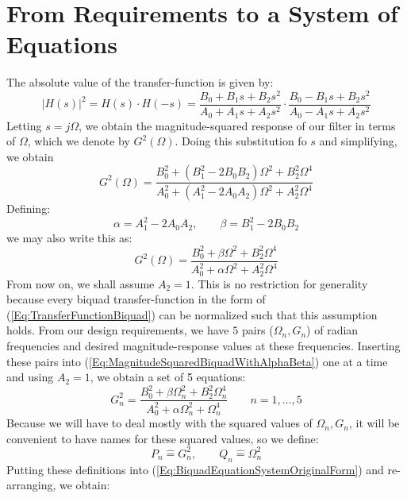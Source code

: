 \section{From Requirements to a System of Equations}
The absolute value of the transfer-function is given by:
\begin{equation}
 |H(s)|^2 = H(s) \cdot H(-s) 
 = \frac{B_0 + B_1 s + B_2 s^2}{A_0 + A_1 s + A_2 s^2} \cdot \frac{B_0 - B_1 s + B_2 s^2}{A_0 - A_1 s + A_2 s^2}
\end{equation}
Letting $s = j \Omega$, we obtain the magnitude-squared response of our filter in terms of $\Omega$, which we denote by $G^2(\Omega)$. Doing this substitution fo $s$ and simplifying, we obtain
\begin{equation}
\label{Eq:MagnitudeSquaredBiquad}
 G^2(\Omega) = \frac{B_0^2 + (B_1^2 - 2 B_0 B_2) \Omega^2 + B_2^2 \Omega^4}{A_0^2 + (A_1^2 - 2 A_0 A_2) \Omega^2 + A_2^2 \Omega^4}
\end{equation}
Defining:
\begin{equation}
\label{Eq:AlphaBeta}
 \alpha = A_1^2 - 2 A_0 A_2, \qquad
 \beta = B_1^2 - 2 B_0 B_2
\end{equation}
we may also write this as:
\begin{equation}
\label{Eq:MagnitudeSquaredBiquadWithAlphaBeta}
 G^2(\Omega) = \frac{B_0^2 + \beta \Omega^2 + B_2^2 \Omega^4}{A_0^2 + \alpha \Omega^2 + A_2^2 \Omega^4}
\end{equation}
From now on, we shall assume $A_2 = 1$. This is no restriction for generality because every biquad transfer-function in the form of (\ref{Eq:TransferFunctionBiquad}) can be normalized such that this assumption holds. From our design requirements, we have $5$ pairs ($\Omega_n, G_n$) of radian frequencies and desired magnitude-response values at these frequencies. Inserting these pairs into (\ref{Eq:MagnitudeSquaredBiquadWithAlphaBeta}) one at a time and using $A_2 = 1$, we obtain a set of 5 equations:
\begin{equation}
\label{Eq:BiquadEquationSystemOriginalForm}
 G_n^2 = \frac{B_0^2 + \beta \Omega_n^2 + B_2^2 \Omega_n^4}{A_0^2 + \alpha \Omega_n^2 + \Omega_n^4} \qquad n = 1, \ldots, 5
\end{equation}
Because we will have to deal mostly with the squared values of $\Omega_n, G_n$, it will be convenient to have names for these squared values, so we define:
\begin{equation}
 P_n \hat{=} G_n^2, \qquad Q_n \hat{=} \Omega_n^2
\end{equation}
Putting these definitions into (\ref{Eq:BiquadEquationSystemOriginalForm}) and re-arranging, we obtain:
